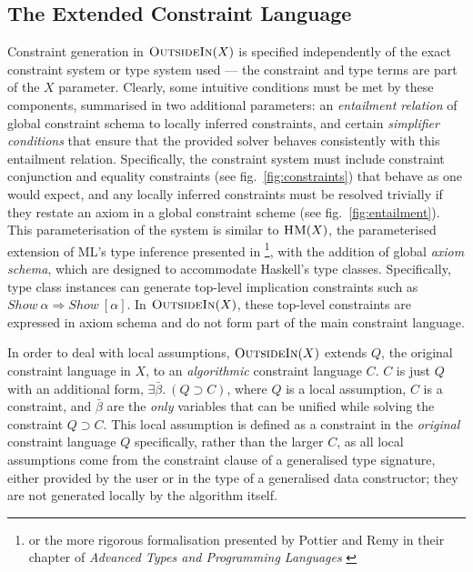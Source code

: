 \documentclass[a4paper]{jfp}
\newcommand{\outsidein}{\textsc{OutsideIn}(X)}
\begin{document}
\subsection{The Extended Constraint Language}

Constraint generation in $\outsidein$ is specified independently of the exact constraint system or type system used --- the constraint and type terms
are part of the $X$ parameter. Clearly, some intuitive conditions must be met by these components, summarised in two additional parameters: an
\emph{entailment relation} of global constraint schema to locally inferred constraints, and certain \emph{simplifier conditions} that ensure that the
provided solver behaves consistently with this entailment relation. Specifically, the constraint system must include constraint conjunction and
equality constraints (see fig.~\ref{fig:constraints}) that behave as one would expect, and any locally inferred constraints must be resolved trivially
if they restate an axiom in a global constraint scheme (see fig.~\ref{fig:entailment}). This parameterisation of the system is similar to
$\textsc{HM}(X)$, the parameterised extension of ML's type inference presented in \cite{Odersky97typeinference}\footnote{or the more rigorous
   formalisation presented by Pottier and Remy in their chapter of \emph{Advanced Types and Programming Languages} \cite{Pottier:2005ue}}, with the
addition of global \emph{axiom schema}, which are designed to accommodate Haskell's type classes. Specifically, type class instances can generate
top-level implication constraints such as $\mathit{Show}\ \alpha \Rightarrow \mathit{Show}\ [\alpha]$. In $\outsidein$, these top-level constraints
are expressed in axiom schema and do not form part of the main constraint language. 

In order to deal with local assumptions, $\outsidein$ extends $Q$, the original constraint language in $X$, to an \emph{algorithmic} constraint
language $C$.  $C$ is just $Q$ with an additional form, $\exists\bar{\beta}.\ (Q \supset C)$, where $Q$ is a local assumption, $C$ is a constraint,
and $\bar{\beta}$ are the \emph{only} variables that can be unified while solving the constraint $Q \supset C$. This local assumption is defined as a
constraint in the \emph{original} constraint language $Q$ specifically, rather than the larger $C$, as all local assumptions come from the constraint
clause of a generalised type signature, either provided by the user or in the type of a generalised data constructor; they are not generated locally
by the algorithm itself.
\end{document}
